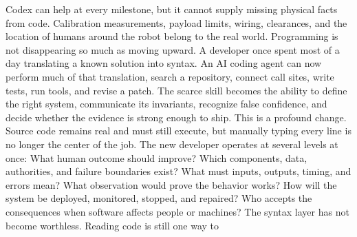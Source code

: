\markdownRendererOlEnd \markdownRendererInterblockSeparator
{}Codex can help at every milestone, but it cannot supply missing physical facts\markdownRendererSoftLineBreak
{}from code. Calibration measurements, payload limits, wiring, clearances, and\markdownRendererSoftLineBreak
{}the location of humans around the robot belong to the real world.\markdownRendererInterblockSeparator
{}\markdownRendererThematicBreak{}\markdownRendererInterblockSeparator
{}
\markdownRendererSectionEnd \markdownRendererSectionBegin
{}\markdownRendererInterblockSeparator
{}Programming is not disappearing so much as moving upward. A developer once\markdownRendererSoftLineBreak
{}spent most of a day translating a known solution into syntax. An AI coding\markdownRendererSoftLineBreak
{}agent can now perform much of that translation, search a repository, connect\markdownRendererSoftLineBreak
{}call sites, write tests, run tools, and revise a patch. The scarce skill becomes\markdownRendererSoftLineBreak
{}the ability to define the right system, communicate its invariants, recognize\markdownRendererSoftLineBreak
{}false confidence, and decide whether the evidence is strong enough to ship.\markdownRendererParagraphSeparator
{}This is a profound change. Source code remains real and must still execute, but\markdownRendererSoftLineBreak
{}manually typing every line is no longer the center of the job. The new\markdownRendererSoftLineBreak
{}developer operates at several levels at once:\markdownRendererInterblockSeparator
{}\markdownRendererUlBegin
\markdownRendererUlItem {} What human outcome should improve?\markdownRendererUlItemEnd 
\markdownRendererUlItem {} Which components, data, authorities, and failure boundaries exist?\markdownRendererUlItemEnd 
\markdownRendererUlItem {} What must inputs, outputs, timing, and errors mean?\markdownRendererUlItemEnd 
\markdownRendererUlItem {} What observation would prove the behavior works?\markdownRendererUlItemEnd 
\markdownRendererUlItem {} How will the system be deployed, monitored, stopped, and repaired?\markdownRendererUlItemEnd 
\markdownRendererUlItem {} Who accepts the consequences when software affects people or machines?\markdownRendererUlItemEnd 
\markdownRendererUlEnd \markdownRendererInterblockSeparator
{}The syntax layer has not become worthless. Reading code is still one way to\markdownRendererSoftLineBreak
